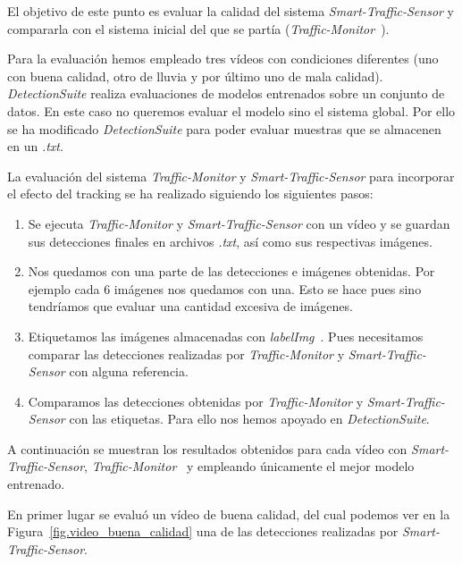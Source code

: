 El objetivo de este punto es evaluar la calidad del sistema \textit{Smart-Traffic-Sensor} y compararla con el sistema inicial del que se partía (\textit{Traffic-Monitor}~\cite{redo_tesis}). 

Para la evaluación hemos empleado tres vídeos con condiciones diferentes (uno con buena calidad, otro de lluvia y por último uno de mala calidad). \textit{DetectionSuite} realiza evaluaciones de modelos entrenados sobre un conjunto de datos. En este caso no queremos evaluar el modelo sino el sistema global. Por ello se ha modificado \textit{DetectionSuite} para poder evaluar muestras que se almacenen en un \textit{.txt}. 

La evaluación del sistema \textit{Traffic-Monitor} y \textit{Smart-Traffic-Sensor} para incorporar el efecto del tracking se ha realizado siguiendo los siguientes pasos:

\begin{enumerate}
    \item Se ejecuta \textit{Traffic-Monitor} y \textit{Smart-Traffic-Sensor} con un vídeo y se guardan sus detecciones finales en archivos \textit{.txt}, así como sus respectivas imágenes.
    \item Nos quedamos con una parte de las detecciones e imágenes obtenidas. Por ejemplo cada 6 imágenes nos quedamos con una. Esto se hace pues sino tendríamos que evaluar una cantidad excesiva de imágenes.
    \item Etiquetamos las imágenes almacenadas con \textit{labelImg}~\cite{labelimg}. Pues necesitamos comparar las detecciones realizadas por \textit{Traffic-Monitor} y \textit{Smart-Traffic-Sensor} con alguna referencia.
    \item Comparamos las detecciones obtenidas por \textit{Traffic-Monitor} y \textit{Smart-Traffic-Sensor} con las etiquetas. Para ello nos hemos apoyado en \textit{DetectionSuite}.
\end{enumerate}


A continuación se muestran los resultados obtenidos para cada vídeo con \textit{Smart-Traffic-Sensor}, \textit{Traffic-Monitor}~\cite{redo_tesis} y empleando únicamente el mejor modelo entrenado.

En primer lugar se evaluó un vídeo de buena calidad, del cual podemos ver en la Figura~\ref{fig.video_buena_calidad} una de las detecciones realizadas por \textit{Smart-Traffic-Sensor}.

